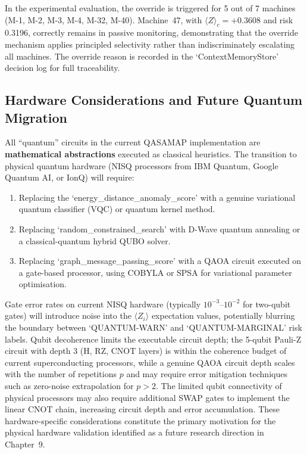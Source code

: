 In the experimental evaluation, the override is triggered for 5 out of 7 machines (M-1, M-2, M-3, M-4, M-32, M-40). Machine~47, with $\langle Z \rangle_c = +0.3608$ and risk 0.3196, correctly remains in passive monitoring, demonstrating that the override mechanism applies principled selectivity rather than indiscriminately escalating all machines. The override reason is recorded in the `ContextMemoryStore' decision log for full traceability.

\subsection{Hardware Considerations and Future Quantum Migration}

All ``quantum'' circuits in the current QASAMAP implementation are \textbf{mathematical abstractions} executed as classical heuristics. The transition to physical quantum hardware (NISQ processors from IBM Quantum, Google Quantum AI, or IonQ) will require:
\begin{enumerate}
    \item Replacing the `energy_distance_anomaly_score' with a genuine variational quantum classifier (VQC) or quantum kernel method.
    \item Replacing `random_constrained_search' with D-Wave quantum annealing or a classical-quantum hybrid QUBO solver.
    \item Replacing `graph_message_passing_score' with a QAOA circuit executed on a gate-based processor, using COBYLA or SPSA for variational parameter optimisation.
\end{enumerate}

Gate error rates on current NISQ hardware (typically $10^{-3}$--$10^{-2}$ for two-qubit gates) will introduce noise into the $\langle Z_i \rangle$ expectation values, potentially blurring the boundary between `QUANTUM-WARN' and `QUANTUM-MARGINAL' risk labels. Qubit decoherence limits the executable circuit depth; the 5-qubit Pauli-Z circuit with depth 3 (H, RZ, CNOT layers) is within the coherence budget of current superconducting processors, while a genuine QAOA circuit depth scales with the number of repetitions $p$ and may require error mitigation techniques such as zero-noise extrapolation for $p > 2$. The limited qubit connectivity of physical processors may also require additional SWAP gates to implement the linear CNOT chain, increasing circuit depth and error accumulation. These hardware-specific considerations constitute the primary motivation for the physical hardware validation identified as a future research direction in Chapter~9.
